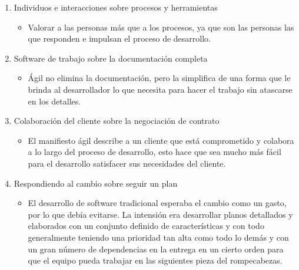 \documentclass[12pt, letterpaper]{article}
\begin{document}
\begin{enumerate}
    
    \item Individuos e interacciones sobre procesos y herramientas
        \begin{itemize}
            \item Valorar a las personas más que a los procesos, ya que son las personas las que responden e 
            impulsan el proceso de desarrollo.
        \end{itemize}
    
    \item Software de trabajo sobre la documentación completa
        \begin{itemize}
            \item Ágil no elimina la documentación, pero la simplifica de una forma que le brinda al 
            desarrollador lo que necesita para hacer el trabajo sin atascarse en los detalles.
        \end{itemize}
    
    \item Colaboración del cliente sobre la negociación de contrato
        \begin{itemize}
            \item El manifiesto ágil describe a un cliente que está comprometido y colabora a lo largo del proceso 
            de desarrollo, esto hace que sea mucho más fácil para el desarrollo satisfacer sus necesidades del 
            cliente.
        \end{itemize}
    
    \item Respondiendo al cambio sobre seguir un plan
        \begin{itemize}
            \item El desarrollo de software tradicional esperaba el cambio como un gasto, por lo que debía 
            evitarse. La intensión era desarrollar planos detallados y elaborados con un conjunto definido de 
            características y con todo generalmente teniendo una prioridad tan alta como todo lo demás y con un
             gran número de dependencias en la entrega en un cierto orden para que el equipo pueda trabajar en 
             las siguientes pieza del rompecabezas.
        \end{itemize}
\end{enumerate}
\end{document}
